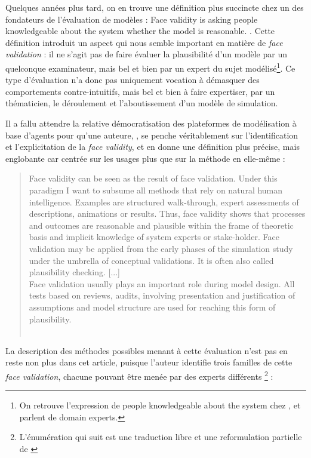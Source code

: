 Quelques années plus tard, on en trouve une définition plus succincte chez un des fondateurs de l'évaluation de modèles : \og Face validity is asking people knowledgeable about the system whether the model is reasonable.\fg{} \autocite[500]{sargent_validation_1979}.
Cette définition introduit un aspect qui nous semble important en matière de \textit{face validation} : il ne s'agit pas de faire évaluer la plausibilité d'un modèle par un quelconque examinateur, mais bel et bien par un expert du sujet modélisé\footnote{
	On retrouve l'expression de \og people knowledgeable about the system\fg{} chez \textcite[130]{balci_validation_1994}, et \textcite[2]{kennedy_verification_2006} parlent de \og domain experts\fg{}.
}.
Ce type d'évaluation n'a donc pas uniquement vocation à démasquer des comportements contre-intuitifs, mais bel et bien à faire expertiser, par un thématicien, le déroulement et l'aboutissement d'un modèle de simulation.

Il a fallu attendre la relative démocratisation des plateformes de modélisation à base d'agents pour qu'une auteure, \citeauthor{klugl_validation_2008}, se penche véritablement sur l'identification et l'explicitation de la \textit{face validity}, et en donne une définition plus précise, mais englobante car centrée sur les usages plus que sur la méthode en elle-même :

\begin{quotation}
	\noindent \og
	Face validity can be seen as the result of face validation. Under this paradigm I want to subsume all methods that rely on natural human intelligence.
	Examples are structured walk-through, expert assessments of descriptions, animations or results.
	Thus, face validity shows that processes and outcomes are reasonable and plausible within the frame of theoretic basis and implicit knowledge of system experts or stake-holder.
	Face validation may be applied from the early phases of the simulation study under the umbrella of conceptual validations.
	It is often also called plausibility checking.
	[...]\\
	Face validation usually plays an important role during model design.
	All tests based on reviews, audits, involving presentation and justification of assumptions and model structure are used for reaching this form of plausibility.
	\fg{}\\
	\mbox{}~ \hfill \textcite[39--41]{klugl_validation_2008}
\end{quotation}


La description des méthodes possibles menant à cette évaluation n'est pas en reste non plus dans cet article, puisque l'auteur identifie trois familles de cette \textit{face validation}, chacune pouvant être menée par des experts différents \footnote{
	L'énumération qui suit est une traduction libre et une reformulation partielle de \textcite[41-42]{klugl_validation_2008}
} :

